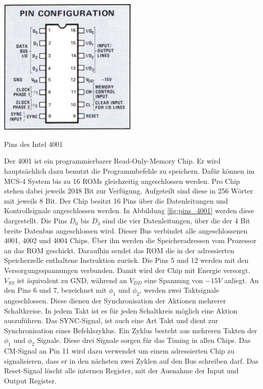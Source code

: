  \begin{floatingfigure}[r]{.5\textwidth}
 	\vspace{-10pt}
 	\includegraphics[width=0.5\textwidth]{figures/pins_4001.png}
 	\caption{Pins des Intel 4001}
 	\label{fig:pins_4001}
 \end{floatingfigure}
 Der 4001 ist ein programmierbarer Read-Only-Memory Chip. Er wird hauptsächlich dazu benutzt die Programmbefehle zu speichern. Dafür können im MCS-4 System bis zu 16 ROMs gleichzeitig angeschlossen werden. Pro Chip stehen dabei jeweils 2048 Bit zur Verfügung. Aufgeteilt sind diese in 256 Wörter mit jeweils 8 Bit. Der Chip besitzt 16 Pins über die Datenleitungen und Kontrollsignale angeschlossen werden. In Abbildung \ref{fig:pins_4001} werden diese dargestellt. Die Pins $D_0$ bis $D_3$ sind die vier Datenleitungen, über die der 4 Bit breite Datenbus angeschlossen wird. Dieser Bus verbindet alle angeschlossenen 4001, 4002 und 4004 Chips. Über ihn werden die Speicheradressen vom Prozessor an das ROM geschickt. Daraufhin sendet das ROM die in der adressierten Speicherzelle enthaltene Instruktion zurück. Die Pins 5 und 12 werden mit den Versorgungsspannungen verbunden. Damit wird der Chip mit Energie versorgt. $V_{SS}$ ist äquivalent zu GND, während an $V_{DD}$ eine Spannung von $-15V$ anliegt.
 An den Pins 6 und 7, bezeichnet mit $\phi_1$ und $\phi_2$, werden zwei Taktsignale angeschlossen. Diese dienen der Synchronisation der Aktionen mehrerer Schaltkreise. In jedem Takt ist es für jeden Schaltkreis möglich eine Aktion auszuführen. Das SYNC-Signal, ist auch eine Art Takt und dient zur Synchronisation eines Befehlszyklus. Ein Zyklus besteht aus mehreren Takten der $\phi_1$ und $\phi_2$ Signale. Diese drei Signale sorgen für das Timing in allen Chips. Das CM-Signal an Pin 11 wird dazu verwendet um einem adressierten Chip zu signalisieren, dass er in den nächsten zwei Zyklen auf den Bus schreiben darf. Das Reset-Signal löscht alle internen Register, mit der Ausnahme der Input und Output Register.
